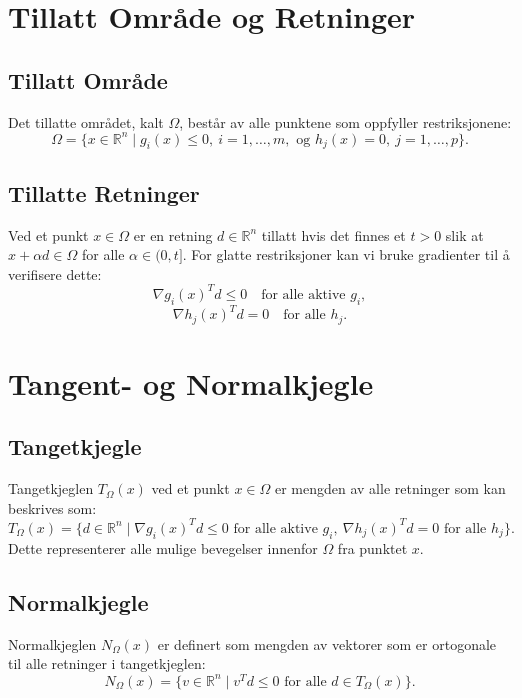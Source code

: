 \section{Tillatt Område og Retninger}

\subsection{Tillatt Område}
Det tillatte området, kalt \(\Omega\), består av alle punktene som oppfyller restriksjonene:
\begin{equation*}
	\Omega = \{x \in \mathbb{R}^n \mid g_i(x) \leq 0,\ i = 1,\ldots,m, \text{ og } h_j(x) = 0,\ j = 1,\ldots,p\}.
\end{equation*}

\subsection{Tillatte Retninger}
Ved et punkt \(x \in \Omega\) er en retning \(d \in \mathbb{R}^n\) tillatt hvis det finnes et \(t > 0\) slik at \(x + \alpha d \in \Omega\) for alle \(\alpha \in (0, t]\). For glatte restriksjoner kan vi bruke gradienter til å verifisere dette:
\begin{equation*}
	\nabla g_i(x)^T d \leq 0 \quad \text{for alle aktive } g_i,
\end{equation*}
\begin{equation*}
	\nabla h_j(x)^T d = 0 \quad \text{for alle } h_j.
\end{equation*}

\section{Tangent- og Normalkjegle}

\subsection{Tangetkjegle}
Tangetkjeglen \(T_{\Omega}(x)\) ved et punkt \(x \in \Omega\) er mengden av alle retninger som kan beskrives som:
\begin{equation*}
	T_{\Omega}(x) = \{d \in \mathbb{R}^n \mid \nabla g_i(x)^T d \leq 0 \text{ for alle aktive } g_i,\ \nabla h_j(x)^T d = 0 \text{ for alle } h_j\}.
\end{equation*}
Dette representerer alle mulige bevegelser innenfor \(\Omega\) fra punktet \(x\).

\subsection{Normalkjegle}
Normalkjeglen \(N_{\Omega}(x)\) er definert som mengden av vektorer som er ortogonale til alle retninger i tangetkjeglen:
\begin{equation*}
	N_{\Omega}(x) = \{v \in \mathbb{R}^n \mid v^T d \leq 0 \text{ for alle } d \in T_{\Omega}(x)\}.
\end{equation*}

